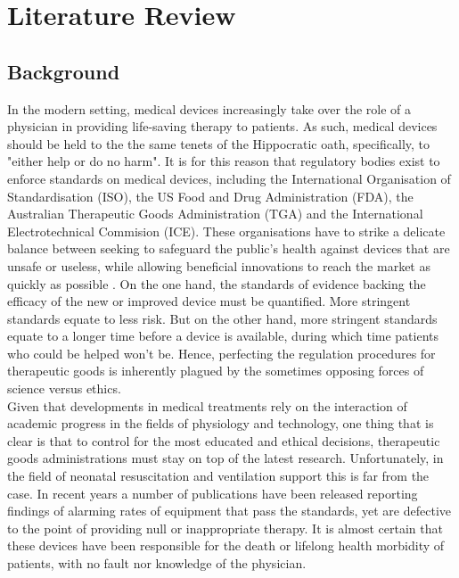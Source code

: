 \documentclass[12pt, openany, oneside]{book}
\begin{document}

\chapter{Literature Review}
\section{Background}


In the modern setting, medical devices increasingly take over the role of a physician in providing life-saving therapy to patients. As such, medical devices should be held to the the same tenets of the Hippocratic oath, specifically, to "either help or do no harm". It is for this reason that regulatory bodies exist to enforce standards on medical devices, including the International Organisation of Standardisation (ISO), the US Food and Drug Administration (FDA), the Australian Therapeutic Goods Administration (TGA) and the International Electrotechnical Commision (ICE). These organisations have to strike a delicate balance between seeking to safeguard the public's health against devices that are unsafe or useless, while allowing beneficial innovations to reach the market as quickly as possible \citep{walker2017ethics}. On the one hand, the standards of evidence backing the efficacy of the new or improved device must be quantified. More stringent standards equate to less risk. But on the other hand, more stringent standards equate to a longer time before a device is available, during which time patients who could be helped won't be. Hence, perfecting the regulation procedures for therapeutic goods is inherently plagued by the sometimes opposing forces of science versus ethics. \\

Given that developments in medical treatments rely on the interaction of academic progress in the fields of physiology and technology, one thing that is clear is that to control for the most educated and ethical decisions, therapeutic goods administrations must stay on top of the latest research. Unfortunately, in the field of neonatal resuscitation and ventilation support this is far from the case. In recent years a number of publications have been released reporting findings of alarming rates of equipment that pass the standards, yet are defective to the point of providing null or inappropriate therapy. It is almost certain that these devices have been responsible for the death or lifelong health morbidity of patients, with no fault nor knowledge of the physician. \\
\end{document}
